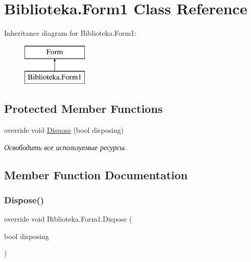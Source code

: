 \hypertarget{class_biblioteka_1_1_form1}{}\section{Biblioteka.\+Form1 Class Reference}
\label{class_biblioteka_1_1_form1}
Inheritance diagram for Biblioteka.\+Form1\+:\begin{figure}[H]
\begin{center}
\leavevmode
\includegraphics[height=2.000000cm]{class_biblioteka_1_1_form1}
\end{center}
\end{figure}
\subsection*{Protected Member Functions}
\begin{DoxyCompactItemize}
\item 
override void \hyperlink{class_biblioteka_1_1_form1_af5983327eaa75c22f4d1be3afd03b184}{Dispose} (bool disposing)
\begin{DoxyCompactList}\small\item\em Освободить все используемые ресурсы. \end{DoxyCompactList}\end{DoxyCompactItemize}


\subsection{Member Function Documentation}
\mbox{\label{class_biblioteka_1_1_form1_af5983327eaa75c22f4d1be3afd03b184}} 
\subsubsection{\texorpdfstring{Dispose()}{Dispose()}}
{\footnotesize\ttfamily override void Biblioteka.\+Form1.\+Dispose (\begin{DoxyParamCaption}\item[{bool}]{disposing }\end{DoxyParamCaption})\hspace{0.3cm}{\ttfamily [protected]}}



